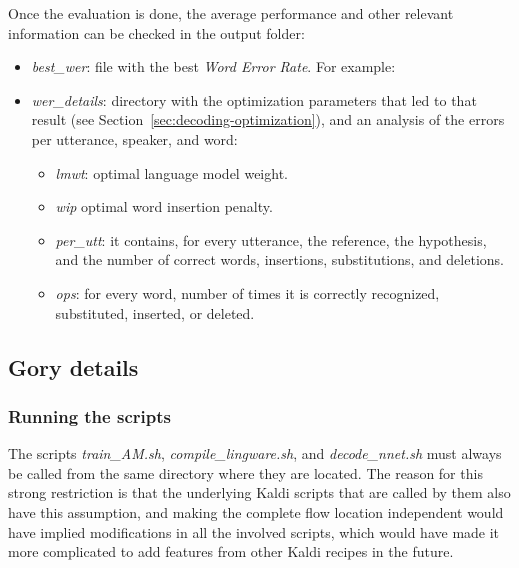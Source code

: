 \documentclass[11pt,a4paper,titlepage,twoside]{article}
\begin{document}
Once the evaluation is done, the average performance and other relevant information can be checked in the output folder:

\begin{itemize}
  \item \textit{best\_wer}: file with the best \textit{Word Error Rate}. For example:
    \begin{center}
      \scriptsize
    \end{center}
  \item \textit{wer\_details}: directory with the optimization parameters that led to that result (see Section~\ref{sec:decoding-optimization}), and an analysis of the errors per utterance, speaker, and word:
    \begin{itemize}
    \item \textit{lmwt}: optimal language model weight.
    \item \textit{wip} optimal word insertion penalty.
    \item \textit{per\_utt}: it contains, for every utterance, the reference, the hypothesis, and the number of correct words, insertions, substitutions, and deletions.
    \item \textit{ops}:  for every word, number of times it is correctly recognized, substituted, inserted, or deleted.
    \end{itemize}

\end{itemize}

\subsection{Gory details}
\label{sec:gory-details}

\subsubsection{Running the scripts}
\label{sec:running-scripts}

The scripts \textit{train\_AM.sh}, \textit{compile\_lingware.sh}, and \textit{decode\_nnet.sh} must always be called from the same directory where they are located. The reason for this strong restriction is that the underlying Kaldi scripts that are called by them also have this assumption, and making the complete flow location independent would have implied modifications in all the involved scripts, which would have made it more complicated to add features from other Kaldi recipes in the future.
\end{document}
